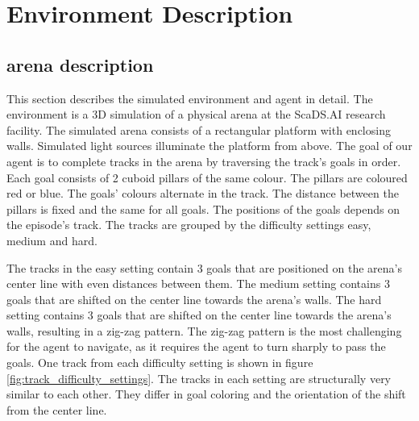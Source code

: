 \chapter{Environment Description}
\label{cha:env_description}



\section{arena description}


This section describes the simulated environment and agent in detail. The environment is a 3D simulation of a physical arena at the ScaDS.AI research facility. The simulated arena consists of a rectangular platform with enclosing walls. Simulated light sources illuminate the platform from above.
The goal of our agent is to complete tracks in the arena by traversing the track's goals in order. Each goal consists of 2 cuboid pillars of the same colour. The pillars are coloured red or blue. The goals' colours alternate in the track. The distance between the pillars is fixed and the same for all goals. The positions of the goals depends on the episode's track. The tracks are grouped by the difficulty settings easy, medium and hard. 

The tracks in the easy setting contain 3 goals that are positioned on the arena's center line with even distances between them. The medium setting contains 3 goals that are shifted on the center line towards the arena's walls. The hard setting contains 3 goals that are shifted on the center line towards the arena's walls, resulting in a zig-zag pattern. The zig-zag pattern is the most challenging for the agent to navigate, as it requires the agent to turn sharply to pass the goals. One track from each difficulty setting is shown in figure \ref{fig:track_difficulty_settings}. The tracks in each setting are structurally very similar to each other. They differ in goal coloring and the orientation of the shift from the center line.


